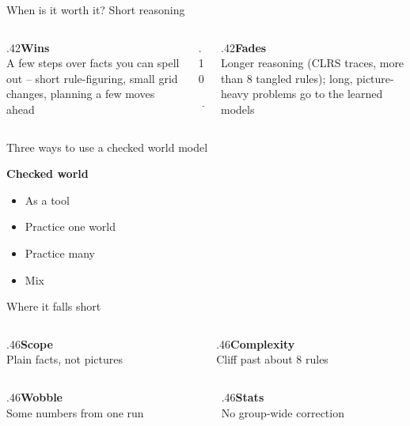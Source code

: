 \documentclass[aspectratio=169,11pt]{beamer}
\begin{document}
\begin{frame}{When is it worth it? Short reasoning}\vfill\begin{columns}[c]\begin{column}{.42\textwidth}{\color{owdeep}\large\bfseries Wins}\\[3pt]{\color{owmuted}A few steps over facts you can spell out -- short rule-figuring, small grid changes, planning a few moves ahead}\end{column}\begin{column}{.10\textwidth}\begin{center}{\color{owochre}\Huge$\rightarrow$}\end{center}\end{column}\begin{column}{.42\textwidth}{\color{owdeep}\large\bfseries Fades}\\[3pt]{\color{owmuted}Longer reasoning (CLRS traces, more than 8 tangled rules); long, picture-heavy problems go to the learned models}\end{column}\end{columns}\vfill\end{frame}
\begin{frame}{Three ways to use a checked world model}\vfill\begin{center}{\color{owdeep}\Large\bfseries Checked world}\end{center}\vskip8pt\begin{itemize}\item As a tool\item Practice one world\item Practice many\item Mix\end{itemize}\vfill\end{frame}
\begin{frame}{Where it falls short}\vfill\begin{columns}[T]\begin{column}{.46\textwidth}{\color{owdeep}\bfseries Scope}\\[2pt]{\color{owmuted}\small Plain facts, not pictures}\end{column}\begin{column}{.46\textwidth}{\color{owdeep}\bfseries Complexity}\\[2pt]{\color{owmuted}\small Cliff past about 8 rules}\end{column}\end{columns}\vskip12pt\begin{columns}[T]\begin{column}{.46\textwidth}{\color{owdeep}\bfseries Wobble}\\[2pt]{\color{owmuted}\small Some numbers from one run}\end{column}\begin{column}{.46\textwidth}{\color{owdeep}\bfseries Stats}\\[2pt]{\color{owmuted}\small No group-wide correction}\end{column}\end{columns}\vfill\end{frame}
\end{document}
